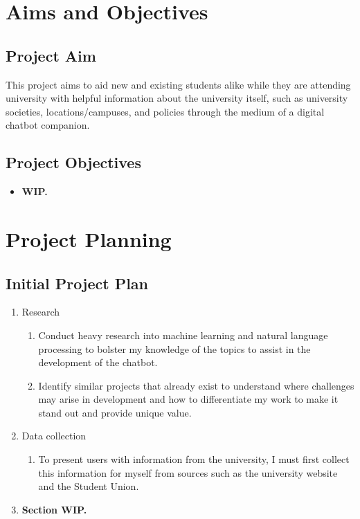 \documentclass[12pt]{report}
\begin{document}
    \chapter{Aims and Objectives}
    \section{Project Aim}
    This project aims to aid new and existing students alike while they are attending university with 
    helpful information about the university itself, such as university societies, locations/campuses, 
    and policies through the medium of a digital chatbot companion.

    \section{Project Objectives}
    \begin{itemize}
        \item \large \textbf{WIP.}
    \end{itemize}


    \chapter{Project Planning}
    \section{Initial Project Plan}
    \begin{enumerate}
        \item Research
        \begin{enumerate}
            \item Conduct heavy research into machine learning and natural language processing to bolster my 
            knowledge of the topics to assist in the development of the chatbot.
            \item Identify similar projects that already exist to understand where challenges may arise in 
            development and how to differentiate my work to make it stand out and provide unique value.
        \end{enumerate}

        \item Data collection
        \begin{enumerate}
            \item To present users with information from the university, I must first collect this information
            for myself from sources such as the university website and the Student Union.
        \end{enumerate}

        \item \large \textbf{Section WIP.}
    \end{enumerate}
\end{document}
